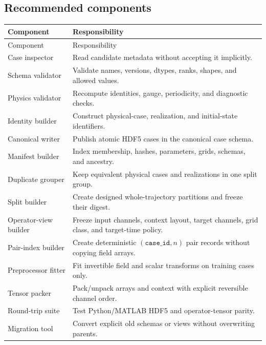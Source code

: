 \documentclass[11pt]{article}
\newcommand{\code}[1]{\texttt{#1}}
\begin{document}
\subsection{Recommended components}
\begin{longtable}{p{}p{}}
\toprule Component & Responsibility \\
\midrule\endfirsthead
\toprule Component & Responsibility \\
\midrule\endhead
Case inspector & Read candidate metadata without accepting it implicitly. \\
Schema validator & Validate names, versions, dtypes, ranks, shapes, and allowed values. \\
Physics validator & Recompute identities, gauge, periodicity, and diagnostic checks. \\
Identity builder & Construct physical-case, realization, and initial-state identifiers. \\
Canonical writer & Publish atomic HDF5 cases in the canonical case schema. \\
Manifest builder & Index membership, hashes, parameters, grids, schemas, and ancestry. \\
Duplicate grouper & Keep equivalent physical cases and realizations in one split group. \\
Split builder & Create designed whole-trajectory partitions and freeze their digest. \\
Operator-view builder & Freeze input channels, context layout, target channels, grid class, and target-time policy. \\
Pair-index builder & Create deterministic $(\code{case\_id},n)$ pair records without copying field arrays. \\
Preprocessor fitter & Fit invertible field and scalar transforms on training cases only. \\
Tensor packer & Pack/unpack arrays and context with explicit reversible channel order. \\
Round-trip suite & Test Python/MATLAB HDF5 and operator-tensor parity. \\
Migration tool & Convert explicit old schemas or views without overwriting parents. \\
\bottomrule
\end{longtable}
\end{document}
